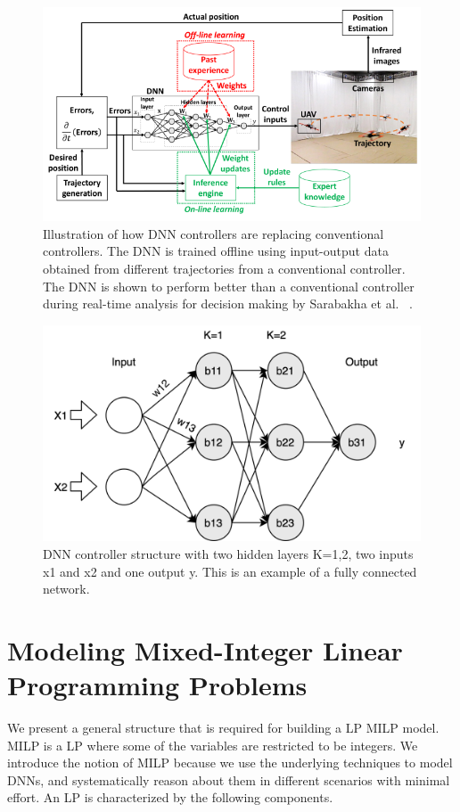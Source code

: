 \begin{figure}
	\centering
	\includegraphics[width=0.7\linewidth]{Images/DNNcontroller}
	\caption{Illustration of how DNN controllers are replacing conventional controllers. The DNN is trained offline using input-output data obtained from different trajectories from a conventional controller. The DNN is shown to perform better than a conventional controller during real-time analysis for decision making by  Sarabakha et al. ~\cite{sarabakha2019online}.}
	\label{fig:dnncontroller}
\end{figure}

\begin{figure}
	\centering
	\includegraphics[width=0.7\linewidth]{Images/DNNstructure}
	\caption[DNN structure]{DNN controller structure with two hidden layers K=1,2, two inputs x1 and x2 and one output y. This is an example of a fully connected network.}
	\label{fig:dnn-controller}
\end{figure}

\section{Modeling Mixed-Integer Linear Programming Problems}
\label{milp}
We present a general structure that is required for building a \ac{LP} \ac{MILP} model.
\ac{MILP} is a \ac{LP} where some of the variables are restricted to be integers. 
We introduce the notion of \ac{MILP} because we use the underlying techniques to model \ac{DNN}s, and systematically reason about them in different scenarios with minimal effort. 
An \ac{LP} is characterized by the following components. 

